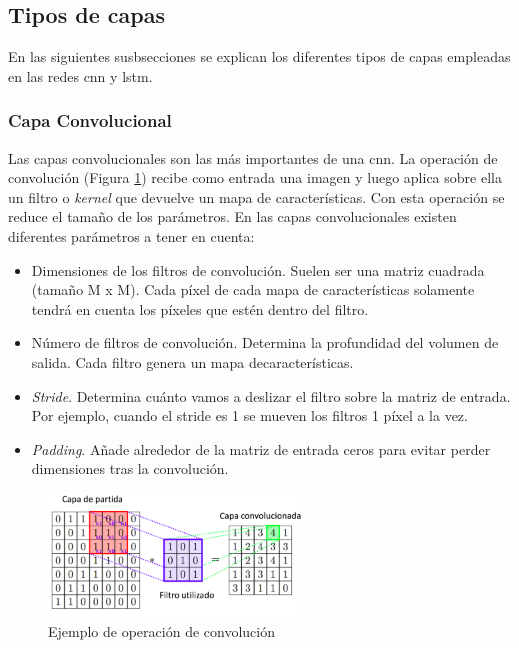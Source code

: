 \subsection{Tipos de capas}

En las siguientes susbsecciones se explican los diferentes tipos de capas empleadas en las redes \acrshort{cnn} y \acrshort{lstm}.


\subsubsection{Capa Convolucional}

Las capas convolucionales son las más importantes de una \acrshort{cnn}. La operación de convolución (Figura \ref{fig.convolucion}) recibe como entrada una imagen y luego aplica sobre ella un filtro o \textit{kernel} que devuelve un mapa de características. Con esta operación se reduce el tamaño de los parámetros. En las capas convolucionales existen diferentes parámetros a tener en cuenta:\\

\begin{itemize}
    \item Dimensiones de los filtros de convolución. Suelen ser una matriz cuadrada (tamaño M x M). Cada píxel de cada mapa de características solamente tendrá en cuenta los píxeles que estén dentro del filtro.
    
    \item Número de filtros de convolución. Determina la profundidad del volumen de salida. Cada filtro genera un mapa decaracterísticas.
    
    \item \textit{Stride}. Determina cuánto vamos a deslizar el filtro sobre la matriz de entrada. Por  ejemplo, cuando el stride es 1 se mueven los filtros 1 píxel a la vez. 
    
    \item \textit{Padding}. Añade alrededor de la matriz de entrada ceros para evitar perder dimensiones tras la convolución.
\end{itemize}

\begin{figure}[H]
  \begin{center}
    \includegraphics[width=0.6\textwidth]{figures/Introduccion/convolucion.png}
		\caption{Ejemplo de operación de convolución}
		\label{fig.convolucion}
		\end{center}
\end{figure}

